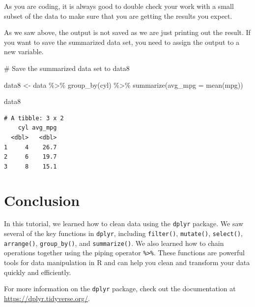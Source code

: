 \documentclass[
  letterpaper,
  DIV=11,
  numbers=noendperiod]{scrreprt}
\newenvironment{Shaded}{\begin{snugshade}}{\end{snugshade}}
\newcommand{\AttributeTok}[1]{\textcolor[rgb]{0.40,0.45,0.13}{#1}}
\newcommand{\CommentTok}[1]{\textcolor[rgb]{0.37,0.37,0.37}{#1}}
\newcommand{\FunctionTok}[1]{\textcolor[rgb]{0.28,0.35,0.67}{#1}}
\newcommand{\NormalTok}[1]{\textcolor[rgb]{0.00,0.23,0.31}{#1}}
\newcommand{\OtherTok}[1]{\textcolor[rgb]{0.00,0.23,0.31}{#1}}
\newcommand{\SpecialCharTok}[1]{\textcolor[rgb]{0.37,0.37,0.37}{#1}}
\begin{document}
\begin{tcolorbox}[enhanced jigsaw, breakable, arc=.35mm, leftrule=.75mm, toprule=.15mm, titlerule=0mm, coltitle=black, colframe=quarto-callout-tip-color-frame, left=2mm, opacitybacktitle=0.6, rightrule=.15mm, bottomrule=.15mm, colback=white, toptitle=1mm, opacityback=0, title=\textcolor{quarto-callout-tip-color}{\faLightbulb}\hspace{0.5em}{Tip}, bottomtitle=1mm, colbacktitle=quarto-callout-tip-color!10!white]

As you are coding, it is always good to double check your work with a
small subset of the data to make sure that you are getting the results
you expect.

\end{tcolorbox}

As we saw above, the output is not saved as we are just printing out the
result. If you want to save the summarized data set, you need to assign
the output to a new variable.

\begin{Shaded}
\begin{Highlighting}[]
\CommentTok{\# Save the summarized data set to data8}

\NormalTok{data8 }\OtherTok{\textless{}{-}}\NormalTok{ data }\SpecialCharTok{\%\textgreater{}\%}
  \FunctionTok{group\_by}\NormalTok{(cyl) }\SpecialCharTok{\%\textgreater{}\%}
  \FunctionTok{summarize}\NormalTok{(}\AttributeTok{avg\_mpg =} \FunctionTok{mean}\NormalTok{(mpg))}

\NormalTok{data8}
\end{Highlighting}
\end{Shaded}

\begin{verbatim}
# A tibble: 3 x 2
    cyl avg_mpg
  <dbl>   <dbl>
1     4    26.7
2     6    19.7
3     8    15.1
\end{verbatim}

\section*{Conclusion}\label{conclusion-6}


In this tutorial, we learned how to clean data using the \texttt{dplyr}
package. We saw several of the key functions in \texttt{dplyr},
including \texttt{filter()}, \texttt{mutate()}, \texttt{select()},
\texttt{arrange()}, \texttt{group\_by()}, and \texttt{summarize()}. We
also learned how to chain operations together using the piping operator
\texttt{\%\textgreater{}\%}. These functions are powerful tools for data
manipulation in R and can help you clean and transform your data quickly
and efficiently.

For more information on the \texttt{dplyr} package, check out the
documentation at \url{https://dplyr.tidyverse.org/}.
\end{document}
